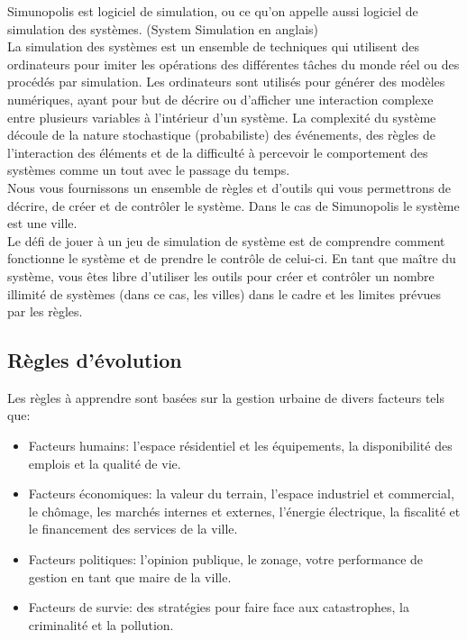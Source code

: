 Simunopolis est logiciel de simulation, ou ce qu’on appelle aussi logiciel de simulation des systèmes. (System Simulation en anglais)\\

La simulation des systèmes est un ensemble de techniques qui utilisent des ordinateurs pour imiter les opérations des différentes tâches du monde réel ou des procédés par simulation. Les ordinateurs sont utilisés pour générer des modèles numériques, ayant pour but de décrire ou d'afficher une interaction complexe entre plusieurs variables à l'intérieur d'un système. La complexité du système découle de la nature stochastique (probabiliste) des événements, des règles de l'interaction des éléments et de la difficulté à percevoir le comportement des systèmes comme un tout avec le passage du temps.\\

Nous vous fournissons un ensemble de règles et d’outils qui vous permettrons de décrire, de créer et de contrôler le système. Dans le cas de Simunopolis le système est une ville.\\

Le défi de jouer à un jeu de simulation de système est de comprendre comment fonctionne le système et de prendre le contrôle de celui-ci. En tant que maître du système, vous êtes libre d'utiliser les outils pour créer et contrôler un nombre illimité de systèmes (dans ce cas, les villes) dans le cadre et les limites prévues par les règles.\\

\subsection{Règles d'évolution}
Les règles à apprendre sont basées sur la gestion urbaine de divers facteurs tels que:
\begin{itemize}
\item Facteurs humains: l'espace résidentiel et les équipements, la disponibilité des emplois et la qualité de vie.
\item Facteurs économiques: la valeur du terrain, l'espace industriel et commercial, le chômage, les marchés internes et externes, l'énergie électrique, la fiscalité et le financement des services de la ville.
\item Facteurs politiques: l'opinion publique, le zonage, votre performance de gestion en tant que maire de la ville.
\item Facteurs de survie: des stratégies pour faire face aux catastrophes, la criminalité et la pollution.
\end{itemize}

